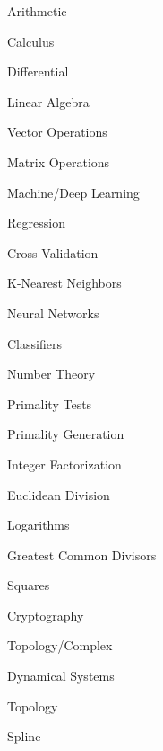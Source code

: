 
\begin{DoxyEnumerate}
\item Arithmetic
\item Calculus
\begin{DoxyItemize}
\item Differential
\end{DoxyItemize}
\item Linear Algebra
\begin{DoxyItemize}
\item Vector Operations
\item Matrix Operations
\end{DoxyItemize}
\item Machine/\+Deep Learning
\begin{DoxyItemize}
\item Regression
\item Cross-\/\+Validation
\item K-\/\+Nearest Neighbors
\item Neural Networks
\item Classifiers
\end{DoxyItemize}
\item Number Theory
\begin{DoxyItemize}
\item Primality Tests
\item Primality Generation
\item Integer Factorization
\item Euclidean Division
\item Logarithms
\item Greatest Common Divisors
\item Squares
\item Cryptography
\end{DoxyItemize}
\item Topology/\+Complex
\begin{DoxyItemize}
\item Dynamical Systems
\item Topology
\item Spline 
\end{DoxyItemize}
\end{DoxyEnumerate}